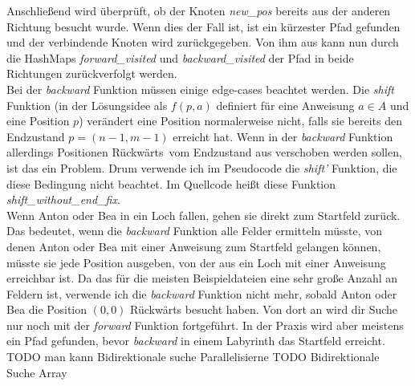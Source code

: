 \documentclass[a4paper,10pt,ngerman]{scrartcl}
\begin{document}
    Anschließend wird überprüft, ob der Knoten \textit{new\_pos} bereits aus der anderen Richtung besucht wurde. Wenn dies der Fall ist, ist ein kürzester Pfad gefunden und der verbindende Knoten wird zurückgegeben. Von ihm aus kann nun durch die HashMaps \textit{forward\_visited} und \textit{backward\_visited} der Pfad in beide Richtungen zurückverfolgt werden. \\
    Bei der \textit{backward} Funktion müssen einige edge-cases beachtet werden. Die \textit{shift} Funktion (in der Lösungsidee als $f(p,a)$ definiert für eine Anweisung $a \in A$ und eine Position $p$) verändert eine Position normalerweise nicht, falls sie bereits den Endzustand $p = (n-1, m-1)$ erreicht hat. Wenn in der \textit{backward} Funktion allerdings Positionen \glqq Rückwärts\grqq~vom Endzustand aus verschoben werden sollen, ist das ein Problem. Drum verwende ich im Pseudocode die \textit{shift'} Funktion, die diese Bedingung nicht beachtet. Im Quellcode heißt diese Funktion \textit{shift\_without\_end\_fix}. \\
    Wenn Anton oder Bea in ein Loch fallen, gehen sie direkt zum Startfeld zurück. Das bedeutet, wenn die \textit{backward} Funktion alle Felder ermitteln müsste, von denen Anton oder Bea mit einer Anweisung zum Startfeld gelangen können, müsste sie jede Position ausgeben, von der aus ein Loch mit einer Anweisung erreichbar ist. Da das für die meisten Beispieldateien eine sehr große Anzahl an Feldern ist, verwende ich die \textit{backward} Funktion nicht mehr, sobald Anton oder Bea die Position $(0,0)$ Rückwärts besucht haben. Von dort an wird dir Suche nur noch mit der \textit{forward} Funktion fortgeführt. In der Praxis wird aber meistens ein Pfad gefunden, bevor \textit{backward} in einem Labyrinth das Startfeld erreicht. \\

    TODO man kann Bidirektionale suche Parallelisierne
    TODO Bidirektionale Suche Array
\end{document}
